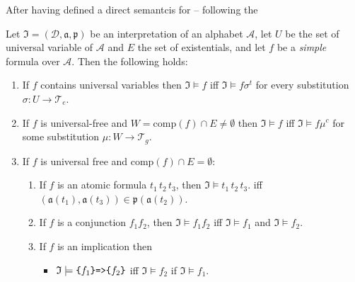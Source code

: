 \begin{definition}
After having defined a direct semantcis for \nthreelogic -- following the


Let $\mathfrak{I}=(\mathcal{D},\mathfrak{a,p})$ be an interpretation of an \nthree alphabet $\mathcal{A}$, let $U$ be the set of universal variable of $\mathcal{A}$ and $E$ the set of existentials,
and let  $f$ be a \emph{simple} formula over $\mathcal{A}$. %
Then the following holds:
\begin{enumerate}
 \item\label{quant1} If $f$ contains universal variables then $\mathfrak{I}\models f$ iff $\mathfrak{I}\models f\sigma^t$ 
 for every substitution $\sigma: U\rightarrow \mathcal{T}_e$. 
 \item \label{quant2} If $f$ is universal-free and $W=\text{comp}(f)\cap E \neq \emptyset$ then $\mathfrak{I}\models f$ 
 iff $\mathfrak{I}\models f\mu^c$ for some substitution $\mu: W\rightarrow \mathcal{T}_g$.
  \item If $f$ is universal free and $\text{comp}(f)\cap E=\emptyset$:
  \begin{enumerate}
   \item If $f$ is an atomic formula $t_1\, t_2\, t_3$, then  $\mathfrak{I} \models t_1\, t_2\, t_3$. 
  iff $(\mathfrak{a}(t_1),\mathfrak{a}(t_3))\in\mathfrak{p}(\mathfrak{a}(t_2))$.
  \item If $f$ is a conjunction $f_1f_2$, then  $\mathfrak{I}\models f_1 f_2$ iff $\mathfrak{I}\models f_1$ and $\mathfrak{I}\models f_2$.\label{conj}
  \item If $f$ is an implication\label{implication} then %
  \begin{itemize}
  \item $\mathfrak{I} \models \verb!{! f_1 \verb!}! \verb!=>! \verb!{! f_2 \verb!}!$ iff $\mathfrak{I} \models f_2$ if $\mathfrak{I} \models f_1$.

\end{itemize}
\end{enumerate}
\end{enumerate}
\end{definition}
